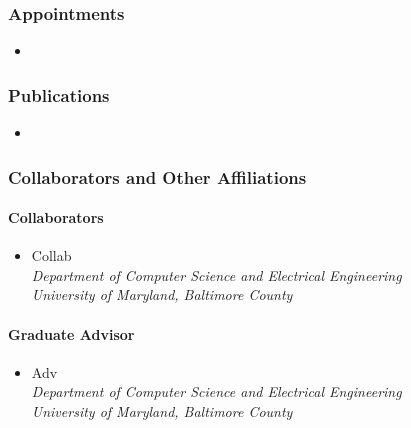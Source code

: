     \subsubsection{Appointments}
      \begin{itemize}
        \item 
      \end{itemize}
    \subsubsection{Publications}
      \begin{itemize}
	\item 
      \end{itemize}
    \subsubsection{Collaborators and Other Affiliations}
      \paragraph{Collaborators}
	\begin{itemize}
          \item Collab\\
            \textit{Department of Computer Science and Electrical Engineering
              \\University of Maryland, Baltimore County}
        \end{itemize}
      \paragraph{Graduate Advisor}
	\begin{itemize}
          \item Adv\\
            \textit{Department of Computer Science and Electrical Engineering
              \\University of Maryland, Baltimore County}
        \end{itemize}